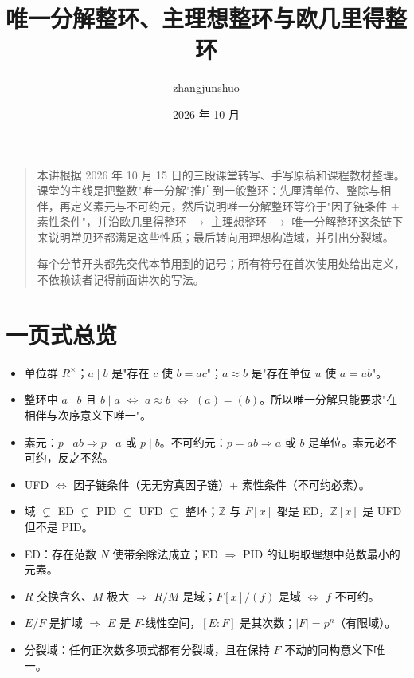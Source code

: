 \documentclass[UTF8,a4paper,11pt]{ctexart}
\title{唯一分解整环、主理想整环与欧几里得整环}\author{zhangjunshuo}\date{2026 年 10 月}
\begin{document}
\maketitle
\begin{quote}
本讲根据 2026 年 10 月 15 日的三段课堂转写、手写原稿和课程教材整理。课堂的主线是把整数"唯一分解"推广到一般整环：先厘清单位、整除与相伴，再定义素元与不可约元，然后说明唯一分解整环等价于"因子链条件 $+$ 素性条件"，并沿欧几里得整环 $\to$ 主理想整环 $\to$ 唯一分解整环这条链下来说明常见环都满足这些性质；最后转向用理想构造域，并引出分裂域。

每个分节开头都先交代本节用到的记号；所有符号在首次使用处给出定义，不依赖读者记得前面讲次的写法。
\end{quote}
\tableofcontents\clearpage






\section*{一页式总览}
\begin{itemize}
\item 单位群 $R^\times$；$a\mid b$ 是"存在 $c$ 使 $b=ac$"；$a\approx b$ 是"存在单位 $u$ 使 $a=ub$"。
\item 整环中 $a\mid b$ 且 $b\mid a$ $\iff$ $a\approx b$ $\iff$ $(a)=(b)$。所以唯一分解只能要求"在相伴与次序意义下唯一"。
\item 素元：$p\mid ab\Rightarrow p\mid a$ 或 $p\mid b$。不可约元：$p=ab\Rightarrow a$ 或 $b$ 是单位。素元必不可约，反之不然。
\item UFD $\iff$ 因子链条件（无无穷真因子链）$+$ 素性条件（不可约必素）。
\item 域 $\subsetneq$ ED $\subsetneq$ PID $\subsetneq$ UFD $\subsetneq$ 整环；$\mathbb Z$ 与 $F[x]$ 都是 ED，$\mathbb Z[x]$ 是 UFD 但不是 PID。
\item ED：存在范数 $N$ 使带余除法成立；ED $\Rightarrow$ PID 的证明取理想中范数最小的元素。
\item $R$ 交换含幺、$M$ 极大 $\Rightarrow$ $R/M$ 是域；$F[x]/(f)$ 是域 $\iff$ $f$ 不可约。
\item $E/F$ 是扩域 $\Rightarrow$ $E$ 是 $F$-线性空间，$[E:F]$ 是其次数；$|F|=p^n$（有限域）。
\item 分裂域：任何正次数多项式都有分裂域，且在保持 $F$ 不动的同构意义下唯一。
\end{itemize}
\end{document}
